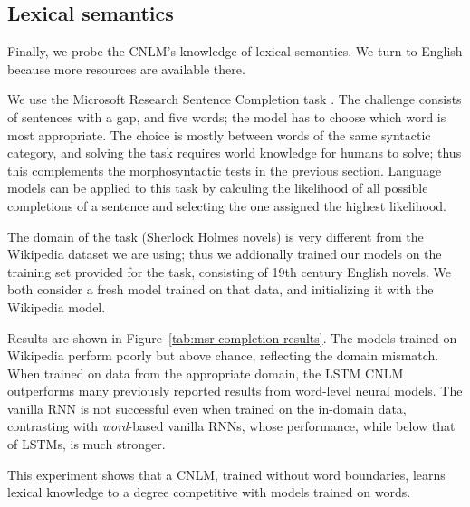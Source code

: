 \subsection{Lexical semantics}
\label{sec:semantics}

Finally, we probe the CNLM's knowledge of lexical semantics.
We turn to  English because more resources are available there.

We use the Microsoft Research Sentence Completion task \cite{Zweig:Burges:2011}.
The challenge consists of sentences with a gap, and five words; the model has to choose which word is most appropriate.
The choice is mostly between words of the same syntactic category, and solving the task requires world knowledge for humans to solve; thus this complements the morphosyntactic tests in the previous section.
Language models can be applied to this task by calculing the likelihood of all possible completions of a sentence and selecting the one assigned the highest likelihood.

The domain of the task (Sherlock Holmes novels) is very different from the Wikipedia dataset we are using; thus we addionally trained our models on the training set provided for the task, consisting of 19th century English novels.
We both consider a fresh model trained on that data, and initializing it with the Wikipedia model.

Results are shown in Figure~\ref{tab:msr-completion-results}.
The models trained on Wikipedia perform poorly but above chance, reflecting the domain mismatch.
When trained on data from the appropriate domain, the LSTM CNLM outperforms many previously reported results from word-level neural models. %
The vanilla RNN is not successful even when trained on the in-domain data, contrasting with \emph{word}-based vanilla RNNs, whose performance, while below that of LSTMs, is much stronger.

This experiment shows that a CNLM, trained without word boundaries, learns lexical knowledge to a degree competitive with models trained on words.

